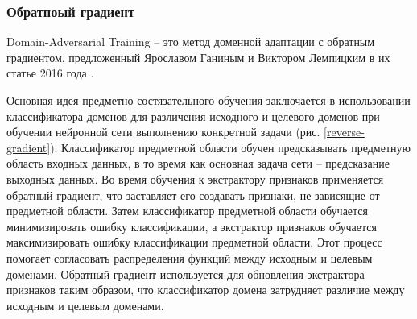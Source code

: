 \subsubsection{Обратноый градиент}\label{sect-1-4-1}

Domain-Adversarial Training -- это метод доменной адаптации с обратным градиентом, предложенный Ярославом Ганиным и Виктором Лемпицким в их статье 2016 года \cite{lib-reverse-gradient}.


Основная идея предметно-состязательного обучения заключается в использовании классификатора доменов для различения исходного и целевого доменов при обучении нейронной сети выполнению конкретной задачи (рис. \ref{reverse-gradient}). Классификатор предметной области обучен предсказывать предметную область входных данных, в то время как основная задача сети -- предсказание выходных данных. Во время обучения к экстрактору признаков применяется обратный градиент, что заставляет его создавать признаки, не зависящие от предметной области. Затем классификатор предметной области обучается минимизировать ошибку классификации, а экстрактор признаков обучается максимизировать ошибку классификации предметной области. Этот процесс помогает согласовать распределения функций между исходным и целевым доменами. Обратный градиент используется для обновления экстрактора признаков таким образом, что классификатор домена затрудняет различие между исходным и целевым доменами. 